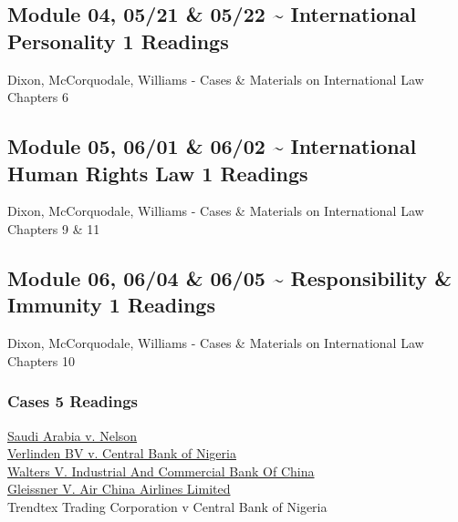 \documentclass[10pt,]{article}
\begin{document}
\hypertarget{module-04-0521-0522-international-personality-1-readings}{%
\subsection{Module 04, 05/21 \& 05/22 \textasciitilde{} International
Personality \textbar{} 1
Readings}\label{module-04-0521-0522-international-personality-1-readings}}

Dixon, McCorquodale, Williams - Cases \& Materials on International Law
Chapters 6

\hypertarget{module-05-0601-0602-international-human-rights-law-1-readings}{%
\subsection{Module 05, 06/01 \& 06/02 \textasciitilde{} International
Human Rights Law \textbar{} 1
Readings}\label{module-05-0601-0602-international-human-rights-law-1-readings}}

Dixon, McCorquodale, Williams - Cases \& Materials on International Law
Chapters 9 \& 11

\hypertarget{module-06-0604-0605-responsibility-immunity-1-readings}{%
\subsection{Module 06, 06/04 \& 06/05 \textasciitilde{} Responsibility
\& Immunity \textbar{} 1
Readings}\label{module-06-0604-0605-responsibility-immunity-1-readings}}

Dixon, McCorquodale, Williams - Cases \& Materials on International Law
Chapters 10

\hypertarget{cases-5-readings}{%
\subsubsection{Cases \textbar{} 5 Readings}\label{cases-5-readings}}

\href{https://scholar.google.com/scholar_case?case=15997705832480823650}{Saudi
Arabia v. Nelson}\\
\href{https://scholar.google.com/scholar_case?case=12305885770783175808}{Verlinden
BV v. Central Bank of Nigeria}\\
\href{https://www.courtlistener.com/opinion/2502147/walters-v-industrial-and-commercial-bank-of-china/}{Walters
V. Industrial And Commercial Bank Of China}\\
\href{https://scholar.google.com/scholar_case?case=3908553268744923367}{Gleissner
V. Air China Airlines Limited}\\
Trendtex Trading Corporation v Central Bank of Nigeria
\end{document}
